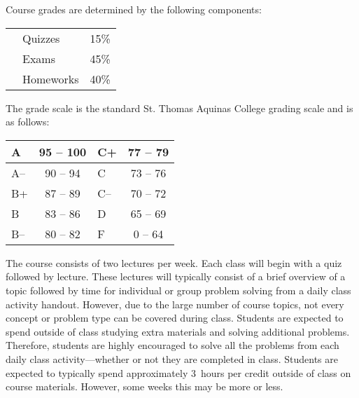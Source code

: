 \documentclass[11pt,letterpaper]{article}
\begin{document}
Course grades are determined by the following components: \par
	\begin{table}[!ht]
        \begin{tabular}{clr}
	& Quizzes & 15\% \\
	& Exams & 45\% \\
	& Homeworks & 40\% \\
        \end{tabular} 
        \end{table}
\pspace



The grade scale is the standard St. Thomas Aquinas College grading scale and is as follows: \par
        \begin{table}[!ht]
        \centering
        \begin{tabular}{|l||c|l||c|} \hline
        A & 95 -- 100 & C+ & 77 -- 79 \\ \hline
        A-- & 90 -- 94 & C & 73 -- 76 \\ \hline
        B+ & 87 -- 89 & C-- & 70 -- 72 \\ \hline
        B & 83 -- 86 & D & 65 -- 69 \\ \hline
        B-- & 80 -- 82 & F & 0 -- 64 \\ \hline
        \end{tabular}
        \end{table} \pspace



The course consists of two lectures per week. Each class will begin with a quiz followed by lecture. These lectures will typically consist of a brief overview of a topic followed by time for individual or group problem solving from a daily class activity handout. However, due to the large number of course topics, not every concept or problem type can be covered during class. Students are expected to spend outside of class studying extra materials and solving additional problems. Therefore, students are highly encouraged to solve all the problems from each daily class activity---whether or not they are completed in class. Students are expected to typically spend approximately 3~hours per credit outside of class on course materials. However, some weeks this may be more or less. \sectionbreak
\end{document}
